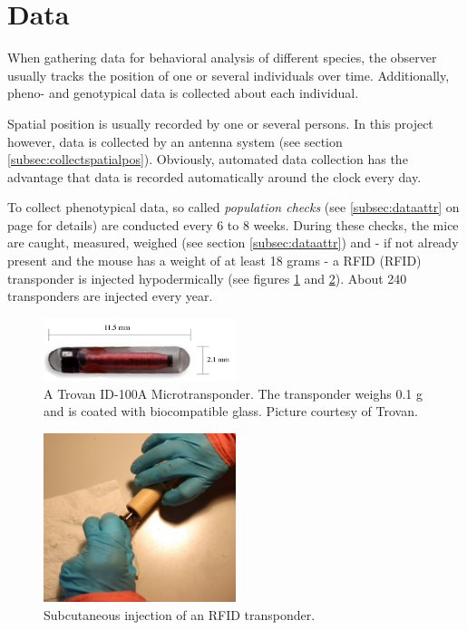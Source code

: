 \newpage
\section{Data}
\label{sec:datacollection}

When gathering data for behavioral analysis of different species, the observer usually tracks the position of one or several individuals over time. Additionally, pheno- and genotypical data is collected about each individual.

Spatial position is usually recorded by one or several persons. In this project however, data is collected by an antenna system (see section \ref{subsec:collectspatialpos}). Obviously, automated data collection has the advantage that data is recorded automatically around the clock every day.

To collect phenotypical data, so called \textit{population checks} (see \ref{subsec:dataattr} on page \pageref{subsec:dataattr} for details) are conducted every 6 to 8 weeks. During these checks, the mice are caught, measured, weighed (see section \ref{subsec:dataattr}) and - if not already present and the mouse has a weight of at least 18 grams - a \ac{RFID} (RFID) transponder is injected hypodermically (see figures \ref{fig:transponder} and \ref{fig:inject_rfid}). About 240 transponders are injected every year.

\begin{figure}[htpb]
\begin{center}
\includegraphics[width=0.5\textwidth]{assets/pdf/transponder.pdf}
  \caption[Trovan ID-100A Microtransponder]{A Trovan ID-100A Microtransponder. The transponder weighs 0.1 g and is coated with biocompatible glass. \footnotesize Picture courtesy of Trovan.}
  \label{fig:transponder}
\end{center}
\end{figure}
\begin{figure}[htpb]
\begin{center}
\includegraphics[width=0.5\textwidth]{assets/pdf/transponder_inject.pdf}
  \caption[Injecting an RFID transponder]{Subcutaneous injection of an RFID transponder.}
  \label{fig:inject_rfid}
\end{center}
\end{figure}

